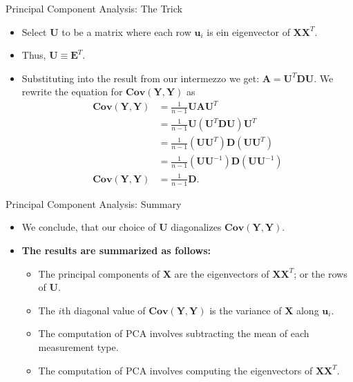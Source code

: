 \begin{frame}{Principal Component Analysis: The Trick}
	\begin{itemize}
		\item Select $\mathbf{U}$ to be a matrix where each row $\mathbf{u}_i$ 
		is ein eigenvector of $\mathbf{XX}^T$.
		\item Thus, $\mathbf{U} \equiv \mathbf{E}^T$.
		\item Substituting into the result from our intermezzo we get: 
		$\mathbf{A} = \mathbf{U}^T\mathbf{DU}$. We rewrite the equation for 
		$\mathbf{Cov}(\mathbf{Y},\mathbf{Y})$ as
		\begin{align}
			\mathbf{Cov}(\mathbf{Y},\mathbf{Y}) & = \frac{1}{n-1} 
			\mathbf{UAU}^T                                  \\
			& = \frac{1}{n-1} \mathbf{U}(\mathbf{U}^T\mathbf{DU})\mathbf{U}^T \\
			& = \frac{1}{n-1} (\mathbf{UU}^T)\mathbf{D}(\mathbf{UU}^T)        \\
			& = \frac{1}{n-1} (\mathbf{UU}^{-1})\mathbf{D}(\mathbf{UU}^{-1})  \\
			\mathbf{Cov}(\mathbf{Y},\mathbf{Y}) & = \frac{1}{n-1} 
			\mathbf{D}.                                     
		\end{align}
	\end{itemize}
\end{frame}

\begin{frame}{Principal Component Analysis: Summary}
	\begin{itemize}
		\item We conclude, that our choice of $\mathbf{U}$ diagonalizes 
		$\mathbf{Cov}(\mathbf{Y},\mathbf{Y})$.
		\item \textbf{The results are summarized as follows:}
		\begin{itemize}
			\item The principal components of $\mathbf{X}$ are the eigenvectors 
			of $\mathbf{XX}^T$; or the rows of $\mathbf{U}$.
			\item The $i$th diagonal value of 
			$\mathbf{Cov}(\mathbf{Y},\mathbf{Y})$ is the variance of 
			$\mathbf{X}$ along $\mathbf{u}_i$.
			\item The computation of PCA involves subtracting the mean of each 
			measurement type.
			\item The computation of PCA involves computing the eigenvectors of 
			$\mathbf{XX}^T$.
		\end{itemize}
	\end{itemize}
\end{frame}

